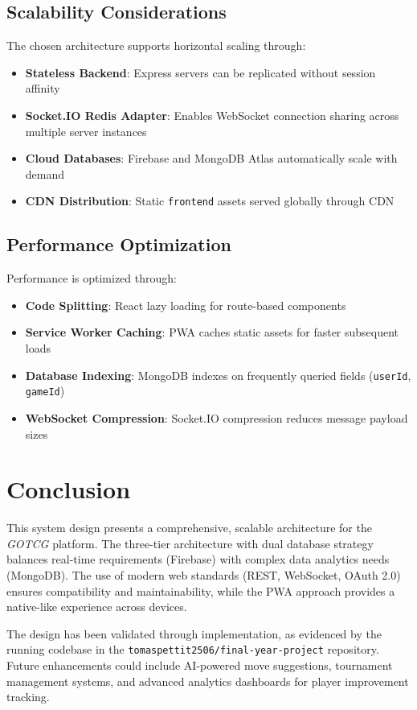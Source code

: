 \subsection*{Scalability Considerations}

The chosen architecture supports horizontal scaling through:

\begin{itemize}
    \item \textbf{Stateless Backend}: Express servers can be replicated without session affinity
    \item \textbf{Socket.IO Redis Adapter}: Enables WebSocket connection sharing across multiple server instances
    \item \textbf{Cloud Databases}: Firebase and MongoDB Atlas automatically scale with demand
    \item \textbf{CDN Distribution}: Static \texttt{frontend} assets served globally through CDN
\end{itemize}

\subsection*{Performance Optimization}

Performance is optimized through:

\begin{itemize}
    \item \textbf{Code Splitting}: React lazy loading for route-based components
    \item \textbf{Service Worker Caching}: PWA caches static assets for faster subsequent loads
    \item \textbf{Database Indexing}: MongoDB indexes on frequently queried fields (\texttt{userId}, \texttt{gameId})
    \item \textbf{WebSocket Compression}: Socket.IO compression reduces message payload sizes
\end{itemize}

\section*{Conclusion}

This system design presents a comprehensive, scalable architecture for the \textit{GOTCG} platform. The three-tier architecture with dual database strategy balances real-time requirements (Firebase) with complex data analytics needs (MongoDB). The use of modern web standards (REST, WebSocket, OAuth 2.0) ensures compatibility and maintainability, while the PWA approach provides a native-like experience across devices.

The design has been validated through implementation, as evidenced by the running codebase in the \texttt{tomaspettit2506/final-year-project} repository. Future enhancements could include AI-powered move suggestions, tournament management systems, and advanced analytics dashboards for player improvement tracking.